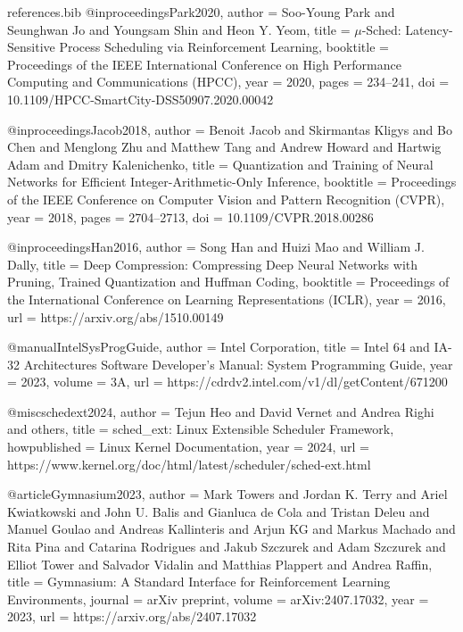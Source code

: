 \begin{filecontents*}{references.bib}
@inproceedings{Park2020,
  author    = {Soo-Young Park and Seunghwan Jo and Youngsam Shin and Heon Y. Yeom},
  title     = {$\mu$-Sched: Latency-Sensitive Process Scheduling via Reinforcement Learning},
  booktitle = {Proceedings of the IEEE International Conference on High Performance Computing and Communications (HPCC)},
  year      = {2020},
  pages     = {234--241},
  doi       = {10.1109/HPCC-SmartCity-DSS50907.2020.00042}
}

@inproceedings{Jacob2018,
  author    = {Benoit Jacob and Skirmantas Kligys and Bo Chen and Menglong Zhu and Matthew Tang and Andrew Howard and Hartwig Adam and Dmitry Kalenichenko},
  title     = {Quantization and Training of Neural Networks for Efficient Integer-Arithmetic-Only Inference},
  booktitle = {Proceedings of the IEEE Conference on Computer Vision and Pattern Recognition (CVPR)},
  year      = {2018},
  pages     = {2704--2713},
  doi       = {10.1109/CVPR.2018.00286}
}

@inproceedings{Han2016,
  author    = {Song Han and Huizi Mao and William J. Dally},
  title     = {Deep Compression: Compressing Deep Neural Networks with Pruning, Trained Quantization and Huffman Coding},
  booktitle = {Proceedings of the International Conference on Learning Representations (ICLR)},
  year      = {2016},
  url       = {https://arxiv.org/abs/1510.00149}
}

@manual{IntelSysProgGuide,
  author    = {{Intel Corporation}},
  title     = {Intel 64 and IA-32 Architectures Software Developer's Manual: System Programming Guide},
  year      = {2023},
  volume    = {3A},
  url       = {https://cdrdv2.intel.com/v1/dl/getContent/671200}
}

@misc{schedext2024,
  author    = {Tejun Heo and David Vernet and Andrea Righi and others},
  title     = {{sched\_ext}: {Linux} Extensible Scheduler Framework},
  howpublished = {Linux Kernel Documentation},
  year      = {2024},
  url       = {https://www.kernel.org/doc/html/latest/scheduler/sched-ext.html}
}

@article{Gymnasium2023,
  author    = {Mark Towers and Jordan K. Terry and Ariel Kwiatkowski and John U. Balis and Gianluca de Cola and Tristan Deleu and Manuel Goulao and Andreas Kallinteris and Arjun KG and Markus Machado and Rita Pina and Catarina Rodrigues and Jakub Szczurek and Adam Szczurek and Elliot Tower and Salvador Vidalin and Matthias Plappert and Andrea Raffin},
  title     = {Gymnasium: A Standard Interface for Reinforcement Learning Environments},
  journal   = {arXiv preprint},
  volume    = {arXiv:2407.17032},
  year      = {2023},
  url       = {https://arxiv.org/abs/2407.17032}
}


\end{filecontents*}

